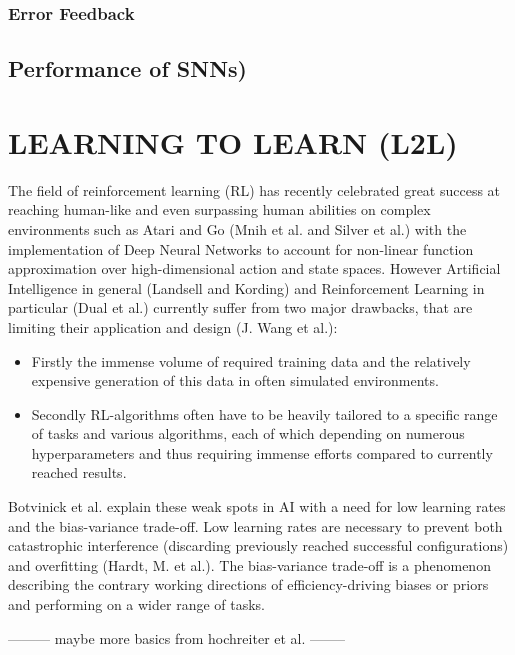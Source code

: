 \documentclass[letterpaper, 10 pt, conference]{ieeeconf}  %
\begin{document}
\subsubsection{Error Feedback}

\subsection{Performance of SNNs)}

\section{LEARNING TO LEARN (L2L)}

The field of reinforcement learning (RL) has recently celebrated great success at reaching human-like and even surpassing human abilities on
complex environments such as Atari and Go (Mnih et al. and Silver et al.) with the implementation of Deep Neural Networks to 
account for non-linear function approximation over high-dimensional action and state spaces. However Artificial Intelligence in general 
(Landsell and Kording) and Reinforcement Learning in particular (Dual et al.) currently suffer from two major drawbacks, 
that are limiting their application and design (J. Wang et al.): 
\begin{itemize}
        \item Firstly the immense volume of required training data and the relatively expensive generation of this data in often simulated
        environments.
        \item Secondly RL-algorithms often have to be heavily tailored to a specific range of tasks and various algorithms, each of which
        depending on numerous hyperparameters and thus requiring immense efforts compared to currently reached results.
\end{itemize}        

Botvinick et al. explain these weak spots in AI with a need for low learning rates and the bias-variance trade-off.
Low learning rates are necessary to prevent both catastrophic interference (discarding previously reached successful
configurations) and overfitting (Hardt, M. et al.). The bias-variance trade-off is a phenomenon describing the contrary 
working directions of efficiency-driving biases or priors and performing on a wider range of tasks. \newline

--------- maybe more basics from hochreiter et al. -------- \newline
\end{document}
